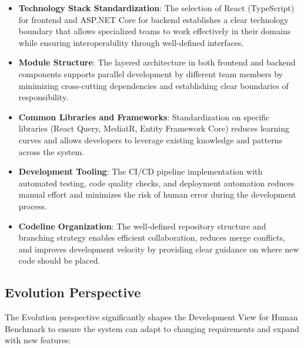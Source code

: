 \begin{itemize}
    \item \textbf{Technology Stack Standardization}: The selection of React (TypeScript) for frontend and ASP.NET Core for backend establishes a clear technology boundary that allows specialized teams to work effectively in their domains while ensuring interoperability through well-defined interfaces.
    
    \item \textbf{Module Structure}: The layered architecture in both frontend and backend components supports parallel development by different team members by minimizing cross-cutting dependencies and establishing clear boundaries of responsibility.
    
    \item \textbf{Common Libraries and Frameworks}: Standardization on specific libraries (React Query, MediatR, Entity Framework Core) reduces learning curves and allows developers to leverage existing knowledge and patterns across the system.
    
    \item \textbf{Development Tooling}: The CI/CD pipeline implementation with automated testing, code quality checks, and deployment automation reduces manual effort and minimizes the risk of human error during the development process.
    
    \item \textbf{Codeline Organization}: The well-defined repository structure and branching strategy enables efficient collaboration, reduces merge conflicts, and improves development velocity by providing clear guidance on where new code should be placed.
\end{itemize}

\subsection{Evolution Perspective}

The Evolution perspective significantly shapes the Development View for Human Benchmark to ensure the system can adapt to changing requirements and expand with new features:

